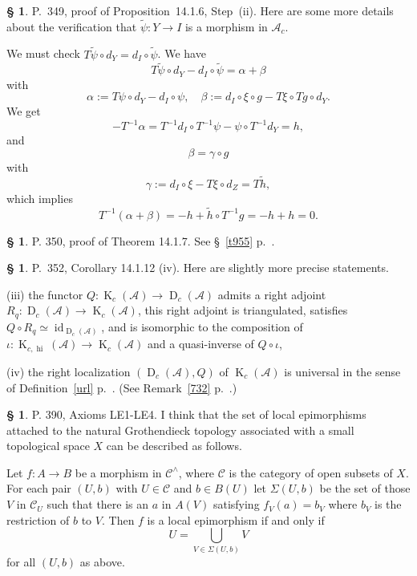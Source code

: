 \documentclass[12pt]{article}
\theoremstyle{remark}
\theoremstyle{definition}
\newtheorem{cm}[thm]{\S}
\newcommand{\bc}{\begin{cm}}\newcommand{\ec}{\end{cm}}
\newcommand{\n}{\noindent}
\newcommand{\A}{\mathcal A}
\newcommand{\C}{\mathcal C}
\newcommand{\oo}{\operatorname}
\newcommand{\pr}{Proposition}
\DeclareMathOperator{\id}{id}
\begin{document}

\bc P.~349, proof of \pr\ 14.1.6, Step~(ii). Here are some more details about the verification that $\widetilde\psi:Y\to I$ is a morphism in $\A_c$. 

We must check $T\widetilde\psi\circ d_Y=d_I\circ\widetilde\psi$. We have 
$$
T\widetilde\psi\circ d_Y-d_I\circ\widetilde\psi=\alpha+\beta
$$
with
$$
\alpha:=T\psi\circ d_Y-d_I\circ\psi,\quad\beta :=d_I\circ\xi\circ g-T\xi\circ Tg\circ d_Y.
$$ 
We get 
$$
-T^{-1}\alpha=T^{-1}d_I\circ T^{-1}\psi-\psi\circ T^{-1}d_Y=h,
$$ 
and 
$$
\beta=\gamma\circ g
$$ 
with 
$$
\gamma:=d_I\circ\xi-T\xi\circ d_Z=T\widetilde h,
$$ 
which implies  
$$
T^{-1}(\alpha+\beta)=-h+\widetilde h\circ T^{-1}g=-h+h=0.
$$
\ec 


\bc P. 350, proof of Theorem 14.1.7. See \S~\ref{t955} p.~\pageref{t955}.
\ec



\bc P.~352, Corollary 14.1.12 (iv). Here are slightly more precise statements. 

\n(iii) the functor $Q:\oo K_c(\A)\to\oo D_c(\A)$ admits a right adjoint $R_q:\oo D_c(\A)\to\oo K_c(\A)$, this right adjoint is triangulated, satisfies $Q\circ R_q\simeq\id_{\oo D_c(\A)}$, and is isomorphic to the composition of $\iota:\oo K_{c,\oo{hi}}(\A)\to\oo K_c(\A)$ and a quasi-inverse of $Q\circ\iota$,

\n(iv) the right localization $(\oo D_c(\A),Q)$ of $\oo K_c(\A)$ is universal in the sense of Definition~\ref{url} p.~\pageref{url}. (See Remark~\ref{732} p.~\pageref{732}.)
\ec 



\bc P. 390, Axioms LE1-LE4. I think that the set of local epimorphisms attached to the natural Grothendieck topology associated with a small topological space $X$ can be described as follows. 

Let $f:A\to B$ be a morphism in $\C^\wedge$, where $\C$ is the category of open subsets of $X$. For each pair $(U,b)$ with $U\in\C$ and $b\in B(U)$ let $\Sigma(U,b)$ be the set of those $V$ in $\C_U$ such that there is an $a$ in $A(V)$ satisfying $f_V(a)=b_V$ where $b_V$ is the restriction of $b$ to $V$. Then $f$ is a local epimorphism if and only if 
$$
U=\bigcup_{V\in\Sigma(U,b)}V
$$ 
for all $(U,b)$ as above.
\ec 
\end{document}
